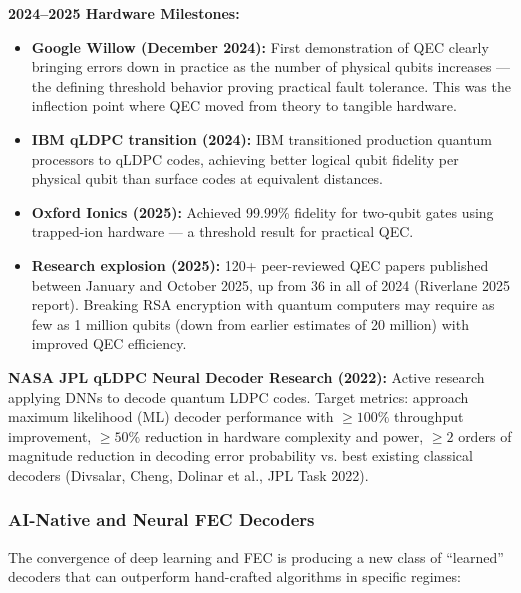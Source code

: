 \documentclass[11pt,letterpaper]{article}
\begin{document}
\textbf{2024--2025 Hardware Milestones:}
\begin{itemize}[leftmargin=*]
  \item \textbf{Google Willow (December 2024):} First demonstration of QEC clearly bringing errors down in practice as the number of physical qubits increases --- the defining threshold behavior proving practical fault tolerance. This was the inflection point where QEC moved from theory to tangible hardware.
  \item \textbf{IBM qLDPC transition (2024):} IBM transitioned production quantum processors to qLDPC codes, achieving better logical qubit fidelity per physical qubit than surface codes at equivalent distances.
  \item \textbf{Oxford Ionics (2025):} Achieved 99.99\% fidelity for two-qubit gates using trapped-ion hardware --- a threshold result for practical QEC.
  \item \textbf{Research explosion (2025):} 120+ peer-reviewed QEC papers published between January and October 2025, up from 36 in all of 2024 (Riverlane 2025 report). Breaking RSA encryption with quantum computers may require as few as 1 million qubits (down from earlier estimates of 20 million) with improved QEC efficiency.
\end{itemize}

\textbf{NASA JPL qLDPC Neural Decoder Research (2022):} Active research applying DNNs to decode quantum LDPC codes. Target metrics: approach maximum likelihood (ML) decoder performance with $\geq 100\%$ throughput improvement, $\geq 50\%$ reduction in hardware complexity and power, $\geq 2$ orders of magnitude reduction in decoding error probability vs. best existing classical decoders (Divsalar, Cheng, Dolinar et al., JPL Task 2022).

\subsubsection{AI-Native and Neural FEC Decoders}

The convergence of deep learning and FEC is producing a new class of ``learned'' decoders that can outperform hand-crafted algorithms in specific regimes:
\end{document}

